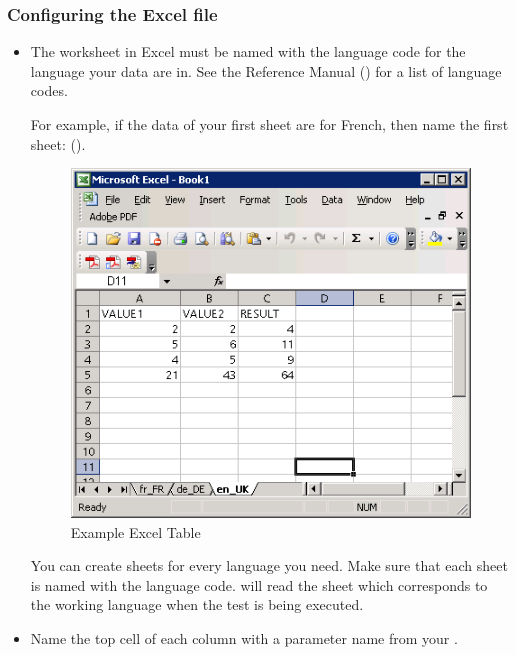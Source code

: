 \subsubsection{Configuring the Excel file}
\label{TasksConfigureExcel}
\begin{itemize}
\item The worksheet in Excel must be named with the language code for the language your data are in. See the Reference Manual () for a list of language codes.

For example, if the data of your first sheet are for French, then name the first sheet:  ().

\begin{figure}[h]
\begin{center}
\includegraphics{Tasks/Testdata/PS/excelexample}
\caption{Example Excel Table}
\label{excel}
\end{center}
\end{figure}

You can create sheets for every language you need. Make sure that each sheet is named with the language code. 
\app{} will read the sheet which corresponds to the working language when the test is being executed. 

\item Name the top cell of each column with a parameter name from your \gdcase{}.


\end{itemize}
